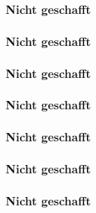 \begin{frame}
 \frametitle{Nicht geschafft}
\end{frame}


\begin{frame}
 \frametitle{Nicht geschafft}
\end{frame}


\begin{frame}
 \frametitle{Nicht geschafft}
\end{frame}


\begin{frame}
 \frametitle{Nicht geschafft}
\end{frame}


\begin{frame}
 \frametitle{Nicht geschafft}
\end{frame}


\begin{frame}
 \frametitle{Nicht geschafft}
\end{frame}


\begin{frame}
 \frametitle{Nicht geschafft}
\end{frame}
